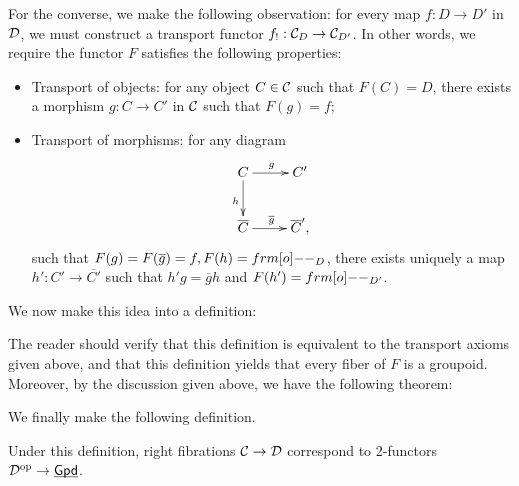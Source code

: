 For the converse, we make the following observation: for every map $f:D\to D'$ in $\mathcal{D}$, we must construct a transport functor
$f_!:\mathcal{C}_D\to\mathcal{C}_{D'}$. In other words, we require the functor $F$ satisfies the following properties:
\begin{itemize}
    \item Transport of objects: for any object $C\in\mathcal{C}$ such that $F(C)=D$, there exists a morphism $g:C\to C'$
    in $\mathcal{C}$ such that $F(g)=f$;
    \item Transport of morphisms: for any diagram $$\xymatrix{C\ar[r]^{g}\ar[d]_{h}&C'\\\overline{C}\ar[r]^{\overline{g}}&\overline{C}',}$$
    such that $F(g)=F(\overline g)=f,F(h)=\1_D$, there exists uniquely a map $h':C'\to\overline{C'}$ such that $h'g=\overline{g}h$
    and $F(h')=\1_{D'}$.
\end{itemize}
We now make this idea into a definition:


The reader should verify that this definition is equivalent to the transport axioms given above, and that this definition
yields that every fiber of $F$ is a groupoid. Moreover, by the discussion given above, we have the following theorem:


We finally make the following definition.


Under this definition, right fibrations $\mathcal{C}\to\mathcal{D}$ correspond to 2-functors $\mathcal{D}^{\mathrm{op}}\to\underline{\smash{\mathsf{Gpd}}}$.

